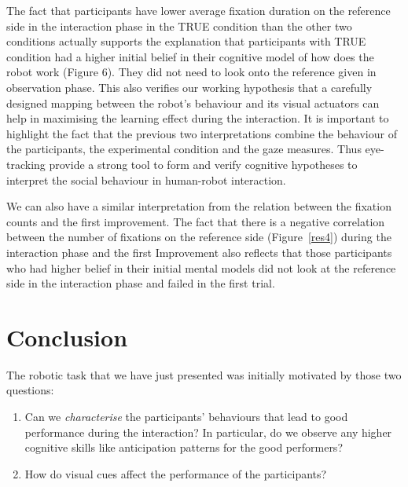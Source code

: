 \documentclass{sig-alternate}
\begin{document}
The fact that participants have lower average fixation duration on the
reference side in the interaction phase in the {\sf TRUE} condition than the
other two conditions actually supports the explanation that participants
with {\sf TRUE} condition had a higher initial belief in their cognitive model
of how does the robot work (Figure 6). They did not need to look onto
the reference given in observation phase. This also verifies our working
hypothesis that a carefully designed mapping between the robot's
behaviour and its visual actuators can help in maximising the learning
effect during the interaction. It is important to highlight the fact that the previous two interpretations combine the behaviour of the participants, the experimental condition and the gaze measures. Thus eye-tracking provide a strong tool to form and verify cognitive hypotheses to interpret the social behaviour in human-robot interaction.

We can also have a similar interpretation from the relation between the fixation counts and the first improvement. The fact that there is a negative correlation  between the number of
fixations on the reference side (Figure~\ref{res4}) during the interaction phase
and the first Improvement also reflects that those participants who had higher belief in their initial mental models did not look at the reference side in the interaction phase and failed in the first trial. 

\section{Conclusion}
\label{conclusion}

The robotic task that we have just presented was initially motivated by those
two questions:

\begin{enumerate}
    \item Can we \emph{characterise} the participants' behaviours that
        lead to good performance during the interaction? In particular, do
        we observe any higher cognitive skills like anticipation patterns for
        the good performers?

    \item How do visual cues affect the performance of the participants?

\end{enumerate}
\end{document}
